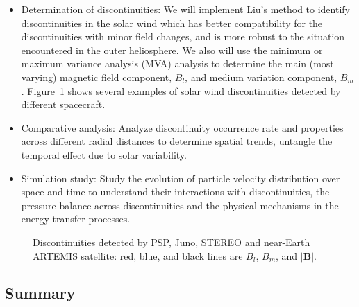 \documentclass[
  letterpaper,
  DIV=11,
  numbers=noendperiod]{scrartcl}
\begin{document}
\begin{itemize}
\item
  Determination of discontinuities: We will implement Liu's \citep{liuMagneticDiscontinuitiesSolar2022} method to identify discontinuities in the solar wind which has better compatibility for the discontinuities with minor field changes, and is more robust to the situation encountered in the outer heliosphere. We also will use the minimum or maximum variance analysis (MVA) analysis \citep{sonnerupMinimumMaximumVariance1998, sonnerupMagnetopauseStructureAttitude1967} to determine the main (most varying) magnetic field component, \(B_l\), and medium variation component, \(B_m\). Figure~\ref{fig-examples} shows several examples of solar wind discontinuities detected by different spacecraft.
\item
  Comparative analysis: Analyze discontinuity occurrence rate and properties across different radial distances to determine spatial trends, untangle the temporal effect due to solar variability.
\item
  Simulation study: Study the evolution of particle velocity distribution over space and time to understand their interactions with discontinuities, the pressure balance across discontinuities and the physical mechanisms in the energy transfer processes.
\end{itemize}

\begin{figure}


\caption{\label{fig-examples}Discontinuities detected by PSP, Juno, STEREO and near-Earth ARTEMIS satellite: red, blue, and black lines are \(B_l\), \(B_m\), and \(|{\mathbf B}|\).}

\end{figure}%

\subsection{Summary}\label{summary}
\end{document}
